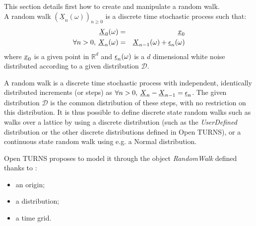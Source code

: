 \renewcommand{\filename}{docUC_StochProc_RandomWalk.tex}
\renewcommand{\filetitle}{UC : Manipulation of a Random Walk}

 \HeaderIILevel

\label{processWN}



This section details first how to create and manipulate a random walk.\\

A random walk $(\underline{X}_n(\omega))_{ n\geq 0}$ is a discrete time stochastic process such that:
\begin{eqnarray}
  {\underline{X}}_0(\omega) & = & {\underline{x}}_0 \\
  \forall n>0,\:{\underline{X}}_n(\omega) & = & {\underline{X}}_{n-1}(\omega) + {\underline{\epsilon}}_n(\omega)
\end{eqnarray}
where ${\underline{x}}_0$ is a given point in $\mathbb{R}^d$ and ${\underline{\epsilon}}_n(\omega)$ is a $d$ dimensional white noise distributed according to a given distribution $\mathcal{D}$. 

A random walk is a discrete time stochastic process with independent, identically distributed increments (or steps) as $\forall n>0,\:{\underline{X}}_n-{\underline{X}}_{n-1}={\underline{\epsilon}}_n$. The given distribution $\mathcal{D}$ is the common distribution of these steps, with no restriction on this distribution. It is thus possible to define discrete state random walks such as walks over a lattice by using a discrete distribution (such as the {\itshape UserDefined} distribution or the other discrete distributions defined in Open TURNS), or a continuous state random walk using e.g. a Normal distribution.

 Open TURNS proposes to model it through the object \emph{RandomWalk} defined thanks to :
\begin{itemize}
\item an origin;
\item a distribution;
\item a time grid.
\end{itemize}


